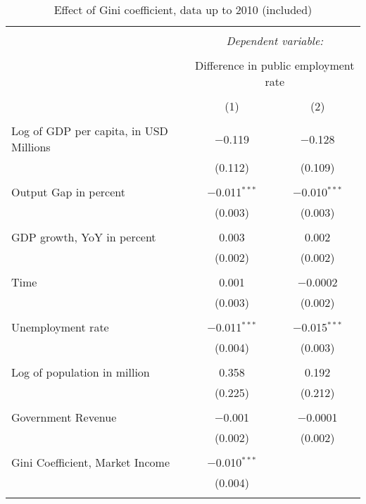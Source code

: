 
\begin{table}[!htbp] \centering 
  \caption{Effect of Gini coefficient, data up to 2010 (included)} 
  \label{} 
\begin{tabular}{@{\extracolsep{5pt}}lcc} 
\\[-1.8ex]\hline 
\hline \\[-1.8ex] 
 & \multicolumn{2}{c}{\textit{Dependent variable:}} \\ 
\cline{2-3} 
\\[-1.8ex] & \multicolumn{2}{c}{Difference in public employment rate} \\ 
\\[-1.8ex] & (1) & (2)\\ 
\hline \\[-1.8ex] 
 Log of GDP per capita, in USD Millions & $-$0.119 & $-$0.128 \\ 
  & (0.112) & (0.109) \\ 
  & & \\ 
 Output Gap in percent & $-$0.011$^{***}$ & $-$0.010$^{***}$ \\ 
  & (0.003) & (0.003) \\ 
  & & \\ 
 GDP growth, YoY in percent & 0.003 & 0.002 \\ 
  & (0.002) & (0.002) \\ 
  & & \\ 
 Time & 0.001 & $-$0.0002 \\ 
  & (0.003) & (0.002) \\ 
  & & \\ 
 Unemployment rate & $-$0.011$^{***}$ & $-$0.015$^{***}$ \\ 
  & (0.004) & (0.003) \\ 
  & & \\ 
 Log of population in million & 0.358 & 0.192 \\ 
  & (0.225) & (0.212) \\ 
  & & \\ 
 Government Revenue & $-$0.001 & $-$0.0001 \\ 
  & (0.002) & (0.002) \\ 
  & & \\ 
 Gini Coefficient, Market Income & $-$0.010$^{***}$ &  \\ 
  & (0.004) &  \\ 
  & & \\ 

\end{tabular}
\end{table}
